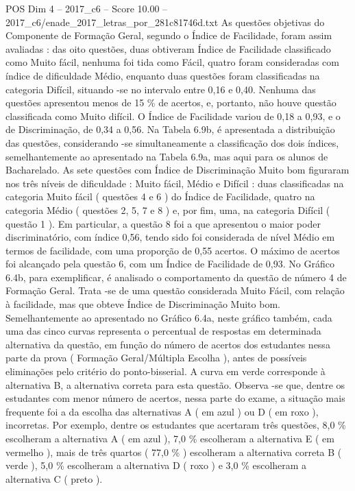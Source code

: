 \begin{textsample}{POS Dim 4 – 2017\_c6 – Score 10.00 – 2017\_c6/enade\_2017\_letras\_por\_281c81746d.txt}
As questões objetivas do Componente de Formação Geral, segundo o Índice de Facilidade, foram assim avaliadas : das oito questões, duas obtiveram Índice de Facilidade classificado como Muito fácil, nenhuma foi tida como Fácil, quatro foram consideradas com índice de dificuldade Médio, enquanto duas questões foram classificadas na categoria Difícil, situando -se no intervalo entre 0,16 e 0,40.
Nenhuma das questões apresentou menos de 15 \% de acertos, e, portanto, não houve questão classificada como Muito difícil.
O Índice de Facilidade variou de 0,18 a 0,93, e o de Discriminação, de 0,34 a 0,56.
Na Tabela 6.9b, é apresentada a distribuição das questões, considerando -se simultaneamente a classificação dos dois índices, semelhantemente ao apresentado na Tabela 6.9a, mas aqui para os alunos de Bacharelado.
As sete questões com Índice de Discriminação Muito bom figuraram nos três níveis de dificuldade : Muito fácil, Médio e Difícil : duas classificadas na categoria Muito fácil ( questões 4 e 6 ) do Índice de Facilidade, quatro na categoria Médio ( questões 2, 5, 7 e 8 ) e, por fim, uma, na categoria Difícil ( questão 1 ).
Em particular, a questão 8 foi a que apresentou o maior poder discriminatório, com índice 0,56, tendo sido foi considerada de nível Médio em termos de facilidade, com uma proporção de 0,55 acertos.
O máximo de acertos foi alcançado pela questão 6, com um Índice de Facilidade de 0,93.
No Gráfico 6.4b, para exemplificar, é analisado o comportamento da questão de número 4 de Formação Geral.
Trata -se de uma questão considerada Muito Fácil, com relação à facilidade, mas que obteve Índice de Discriminação Muito bom.
Semelhantemente ao apresentado no Gráfico 6.4a, neste gráfico também, cada uma das cinco curvas representa o percentual de respostas em determinada alternativa da questão, em função do número de acertos dos estudantes nessa parte da prova ( Formação Geral/Múltipla Escolha ), antes de possíveis eliminações pelo critério do ponto-bisserial.
A curva em verde corresponde à alternativa B, a alternativa correta para esta questão.
Observa -se que, dentre os estudantes com menor número de acertos, nessa parte do exame, a situação mais frequente foi a da escolha das alternativas A ( em azul ) ou D ( em roxo ), incorretas.
Por exemplo, dentre os estudantes que acertaram três questões, 8,0 \% escolheram a alternativa A ( em azul ), 7,0 \% escolheram a alternativa E ( em vermelho ), mais de três quartos ( 77,0 \% ) escolheram a alternativa correta B ( verde ), 5,0 \% escolheram a alternativa D ( roxo ) e 3,0 \% escolheram a alternativa C ( preto ).

\end{textsample}
